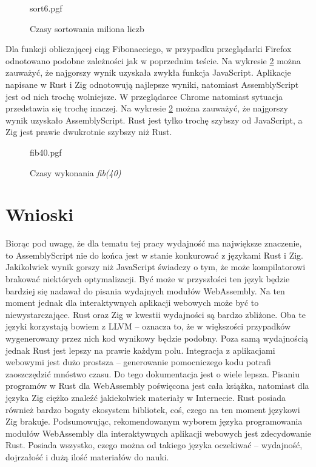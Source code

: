 \documentclass[language=polish,type=master]{aghmodern}
\begin{document}
\begin{figure}[H]
    \centering
    {sort6.pgf}
    \caption{Czasy sortowania miliona liczb}
    \label{fig:sort6}
\end{figure}

\pagebreak

Dla funkcji obliczającej ciąg Fibonacciego, w przypadku przeglądarki Firefox odnotowano podobne zależności jak w poprzednim teście.
Na wykresie \ref{fig:fib40} można zauważyć, że najgorszy wynik uzyskała zwykła funkcja JavaScript.
Aplikacje napisane w Rust i Zig odnotowują najlepsze wyniki, natomiast AssemblyScript jest od nich trochę wolniejsze.
W przeglądarce Chrome natomiast sytuacja przedstawia się trochę inaczej.
Na wykresie \ref{fig:fib40} można zauważyć, że najgorszy wynik uzyskało AssemblyScript.
Rust jest tylko trochę szybszy od JavaScript, a Zig jest prawie dwukrotnie szybszy niż Rust.

\begin{figure}[H]
    \centering
    {fib40.pgf}
    \caption{Czasy wykonania \emph{fib(40)}}
    \label{fig:fib40}
\end{figure}

\section{Wnioski}
Biorąc pod uwagę, że dla tematu tej pracy wydajność ma największe znaczenie, to AssemblyScript nie do końca jest w stanie konkurować z językami Rust i Zig.
Jakikolwiek wynik gorszy niż JavaScript świadczy o tym, że może kompilatorowi brakować niektórych optymalizacji.
Być może w przyszłości ten język będzie bardziej się nadawał do pisania wydajnych modułów WebAssembly.
Na ten moment jednak dla interaktywnych aplikacji webowych może być to niewystarczające.
Rust oraz Zig w kwestii wydajności są bardzo zbliżone.
Oba te języki korzystają bowiem z LLVM -- oznacza to, że w większości przypadków wygenerowany przez nich kod wynikowy będzie podobny.
Poza samą wydajnością jednak Rust jest lepszy na prawie każdym polu.
Integracja z aplikacjami webowymi jest dużo prostsza -- generowanie pomocniczego kodu potrafi zaoszczędzić mnóstwo czasu.
Do tego dokumentacja jest o wiele lepsza.
Pisaniu programów w Rust dla WebAssembly poświęcona jest cała książka, natomiast dla języka Zig ciężko znaleźć jakiekolwiek materiały w Internecie.
Rust posiada również bardzo bogaty ekosystem bibliotek, coś, czego na ten moment językowi Zig brakuje.
Podsumowując, rekomendowanym wyborem języka programowania modułów WebAssembly dla interaktywnych aplikacji webowych jest zdecydowanie Rust.
Posiada wszystko, czego można od takiego języka oczekiwać -- wydajność, dojrzałość i dużą ilość materiałów do nauki.
\end{document}
